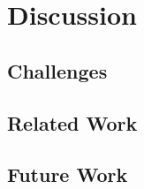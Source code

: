 \chapter{Discussion}
\label{chapter:discussion}
\section{Challenges}
\section{Related Work}
\section{Future Work}
